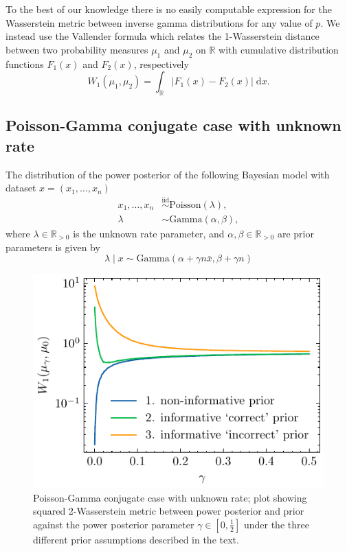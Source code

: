 \documentclass[12pt]{article}
\begin{document}
To the best of our knowledge there is no easily computable expression for the
Wasserstein metric between inverse gamma distributions for any value of $p$.
We instead use the Vallender formula which relates the 1-Wasserstein distance
between two probability measures $\mu_1$ and $\mu_2$ on $\mathbb{R}$ with
cumulative distribution functions $F_1(x)$ and $F_2(x)$, respectively
\begin{equation}
W_1(\mu_1, \mu_2) = \int_{\mathbb{R}} | F_1(x) - F_2(x) | \; \mathrm{d}x.
\end{equation}


\subsection{Poisson-Gamma conjugate case with unknown rate}
The distribution of the power posterior of the following Bayesian model with
dataset $x = (x_1, \ldots, x_n)$ 
\begin{subequations}
\begin{align}
x_1, \ldots, x_n &\overset{\mathrm{iid}}{\sim} \text{Poisson}(\lambda), \\
\lambda &\sim \text{Gamma}(\alpha, \beta),
\end{align}
\end{subequations}
where $\lambda \in \mathbb{R}_{>0}$ is the unknown rate parameter, and $\alpha,
\beta \in \mathbb{R}_{>0}$ are prior parameters is given by
\begin{equation}
\lambda \; | \; x \sim \text{Gamma} \left( \alpha + \gamma n \bar{x}, \beta + \gamma n \right)
\end{equation}

\begin{figure}[htbp]
  \centering
  \includegraphics{imgs/wasserstein_distance.pdf} 
  \caption{Poisson-Gamma conjugate case with unknown rate; plot showing squared 2-Wasserstein metric between power posterior and prior against the power posterior parameter $\gamma \in [0, \frac{1}{2}]$ under the three different prior assumptions described in the text.} 
  \label{fig:poisson_ga} 
\end{figure}
\end{document}
